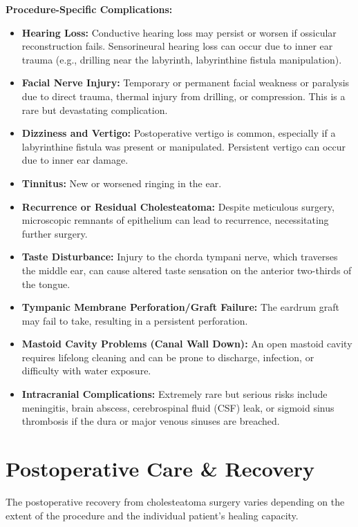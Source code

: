 \textbf{Procedure-Specific Complications:}
\begin{itemize}
  \item \textbf{Hearing Loss:} Conductive hearing loss may persist or worsen if ossicular reconstruction fails. Sensorineural hearing loss can occur due to inner ear trauma (e.g., drilling near the labyrinth, labyrinthine fistula manipulation).
  
  \item \textbf{Facial Nerve Injury:} Temporary or permanent facial weakness or paralysis due to direct trauma, thermal injury from drilling, or compression. This is a rare but devastating complication.
  
  \item \textbf{Dizziness and Vertigo:} Postoperative vertigo is common, especially if a labyrinthine fistula was present or manipulated. Persistent vertigo can occur due to inner ear damage.
  
  \item \textbf{Tinnitus:} New or worsened ringing in the ear.
  
  \item \textbf{Recurrence or Residual Cholesteatoma:} Despite meticulous surgery, microscopic remnants of epithelium can lead to recurrence, necessitating further surgery.
  
  \item \textbf{Taste Disturbance:} Injury to the chorda tympani nerve, which traverses the middle ear, can cause altered taste sensation on the anterior two-thirds of the tongue.
  
  \item \textbf{Tympanic Membrane Perforation/Graft Failure:} The eardrum graft may fail to take, resulting in a persistent perforation.
  
  \item \textbf{Mastoid Cavity Problems (Canal Wall Down):} An open mastoid cavity requires lifelong cleaning and can be prone to discharge, infection, or difficulty with water exposure.
  
  \item \textbf{Intracranial Complications:} Extremely rare but serious risks include meningitis, brain abscess, cerebrospinal fluid (CSF) leak, or sigmoid sinus thrombosis if the dura or major venous sinuses are breached.
\end{itemize}

\section*{Postoperative Care \& Recovery}
The postoperative recovery from cholesteatoma surgery varies depending on the extent of the procedure and the individual patient's healing capacity. 

